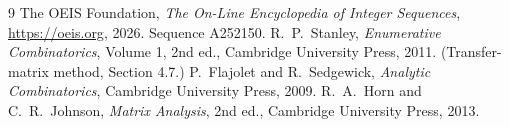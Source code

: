 \documentclass[11pt,a4paper]{article}
\theoremstyle{plain}
\theoremstyle{definition}
\begin{document}
\begin{thebibliography}{9}
 The OEIS Foundation, \emph{The On-Line Encyclopedia of Integer
Sequences}, \url{https://oeis.org}, 2026. Sequence A252150.
 R.~P.~Stanley, \emph{Enumerative Combinatorics}, Volume 1, 2nd ed.,
Cambridge University Press, 2011. (Transfer-matrix method, Section 4.7.)
 P.~Flajolet and R.~Sedgewick, \emph{Analytic Combinatorics}, Cambridge
University Press, 2009.
 R.~A.~Horn and C.~R.~Johnson, \emph{Matrix Analysis}, 2nd ed., Cambridge
University Press, 2013.
\end{thebibliography}
\end{document}
